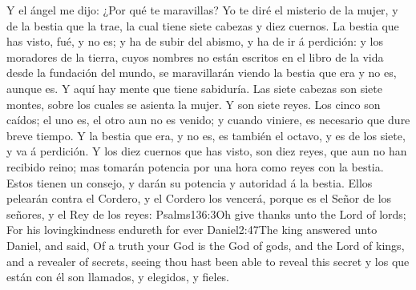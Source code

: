 Y el ángel me dijo: ¿Por qué te maravillas? Yo te diré el misterio de la mujer, y de la bestia que la trae, la cual tiene siete cabezas y diez cuernos. 
La bestia que has visto, fué, y no es; y ha de subir del abismo, y ha de ir á perdición: y los moradores de la tierra, cuyos nombres no están escritos en el libro de la vida desde la fundación del mundo, se maravillarán viendo la bestia que era y no es, aunque es. 
Y aquí hay mente que tiene sabiduría. Las siete cabezas son siete montes, sobre los cuales se asienta la mujer. 
Y son siete reyes. Los cinco son caídos; el uno es, el otro aun no es venido; y cuando viniere, es necesario que dure breve tiempo. 
Y la bestia que era, y no es, es también el octavo, y es de los siete, y va á perdición. 
Y los diez cuernos que has visto, son diez reyes,%
 que aun no han recibido reino; mas tomarán potencia por una hora como reyes con la bestia. 
Estos tienen un consejo, y darán su potencia y autoridad á la bestia. 
Ellos pelearán contra el Cordero, y el Cordero los vencerá, porque es el Señor de los señores, y el Rey de los reyes:%
				  {Psalms}{136:3}{Oh give thanks unto the Lord of lords; For his lovingkindness endureth for ever}%
				   {Daniel}{2:47}{The king answered unto Daniel, and said, Of a truth your God is the God of gods, and the Lord of kings, and a revealer of secrets, seeing thou hast been able to reveal this secret}
 y los que están con él son llamados, y elegidos, y fieles. 

